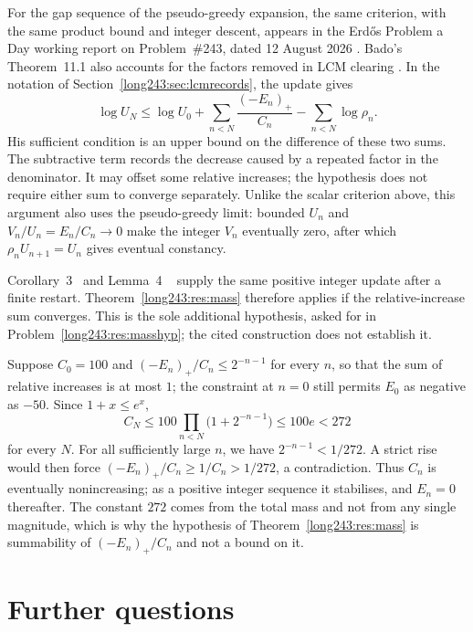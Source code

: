\documentclass[11pt]{article}
\begin{document}
For the gap sequence of the pseudo-greedy expansion, the same criterion, with
the same product bound and integer descent, appears in the Erd\H{o}s Problem a
Day working report on Problem~\#243, dated 12 August 2026
\cite[``A global termination criterion'']{erdosproblemaday243}. Bado's
Theorem~11.1 also accounts for the factors removed in LCM clearing
\cite[Thm.~11.1 and Remark~11.3, p.~9]{bado2026}. In the notation of
Section~\ref{long243:sec:lcmrecords}, the update gives
\[
 \log U_N\le\log U_0+
 \sum_{n<N}\frac{(-E_n)_+}{C_n}-\sum_{n<N}\log\rho_n.
\]
His sufficient condition is an upper bound on the difference of these
two sums. The subtractive term records the decrease caused by a repeated
factor in the denominator. It may offset some relative increases; the
hypothesis does not require either sum to converge separately. Unlike the
scalar criterion above, this argument also uses the pseudo-greedy limit:
bounded $U_n$ and $V_n/U_n=E_n/C_n\to0$ make the integer $V_n$ eventually
zero, after which $\rho_nU_{n+1}=U_n$ gives eventual constancy.

Corollary~3~\cite[p.~9]{koizumi2025} and Lemma~4
~\cite[pp.~11--12]{koizumi2025} supply the same positive integer update
after a finite restart. Theorem~\ref{long243:res:mass} therefore applies
if the relative-increase sum converges. This is the sole additional
hypothesis, asked for in Problem~\ref{long243:res:masshyp}; the cited
construction does not establish it.

\begin{example}\label{long243:ex:mass}
Suppose $C_0=100$ and $(-E_n)_+/C_n\le2^{-n-1}$ for every $n$, so that the
sum of relative increases is at most $1$; the constraint at $n=0$ still permits
$E_0$ as negative as $-50$.  Since $1+x\le e^{x}$,
\[
 C_N\le100\prod_{n<N}\bigl(1+2^{-n-1}\bigr)\le100e<272
\]
for every $N$. For all sufficiently large $n$, we have
$2^{-n-1}<1/272$. A strict rise would then force
$(-E_n)_+/C_n\ge1/C_n>1/272$, a contradiction. Thus $C_n$ is eventually
nonincreasing; as a positive integer sequence it stabilises, and $E_n=0$
thereafter. The constant $272$ comes from the total mass and not from any single magnitude,
which is why the hypothesis of Theorem~\ref{long243:res:mass} is summability of
$(-E_n)_+/C_n$ and not a bound on it.
\end{example}

\section{Further questions}\label{long243:sec:open}
\end{document}
